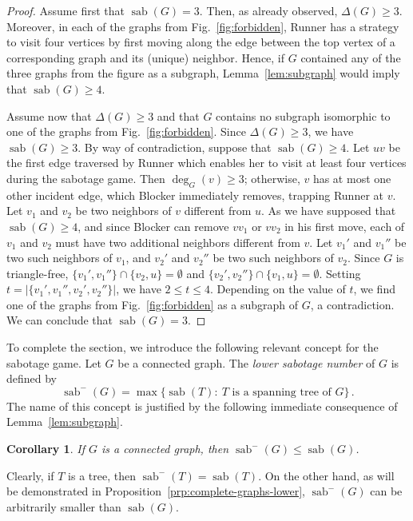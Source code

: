 \documentclass[12pt]{article}
\newtheorem{corollary}[theorem]{Corollary}
\DeclareMathOperator{\sab}{\mathrm{sab}}
\begin{document}
\begin{proof}
Assume first that $\sab(G) = 3$. Then, as already observed, $\Delta(G)\ge 3$. Moreover, in each of the graphs from Fig.~\ref{fig:forbidden}, Runner has a strategy to visit four vertices by first moving along the edge between the top vertex of a corresponding graph and its (unique) neighbor. Hence, if $G$ contained any of the three graphs from the figure as a subgraph, Lemma~\ref{lem:subgraph} would imply that $\sab(G)\ge 4$.

Assume now that $\Delta(G) \ge 3$ and that $G$ contains no subgraph isomorphic to one of the graphs from Fig.~\ref{fig:forbidden}. Since $\Delta(G) \ge 3$, we have $\sab(G)\ge 3$. By way of contradiction, suppose that $\sab (G)\ge 4$. Let $uv$ be the first edge traversed by Runner which enables her to visit at least four vertices during the sabotage game. Then $\deg_G(v)\ge 3$; otherwise, $v$ has at most one other incident edge, which Blocker immediately removes, trapping Runner at $v$. Let $v_1$ and $v_2$ be two neighbors of $v$ different from $u$. As we have supposed that $\sab (G)\ge 4$, and since Blocker can remove $vv_1$ or $vv_2$ in his first move, each of $v_1$ and $v_2$ must have two additional neighbors different from $v$. Let $v_1'$ and $v_1''$ be two such neighbors of $v_1$, and $v_2'$ and $v_2''$ be two such neighbors of $v_2$. Since $G$ is triangle-free, $\{v_1', v_1''\} \cap \{v_2, u\} = \emptyset$ and $\{v_2', v_2''\} \cap \{v_1, u\} = \emptyset$. Setting $t = |\{v_1', v_1'', v_2', v_2''\}|$, we have $2\le t\le 4$. Depending on the value of $t$, we find one of the graphs from Fig.~\ref{fig:forbidden} as a subgraph of $G$, a contradiction. We can conclude that $\sab(G) = 3$.
\end{proof}

To complete the section, we introduce the following relevant concept for the sabotage game. Let $G$ be a connected graph. The \emph{lower sabotage number} of $G$ is defined by 
$$\sab^{-}(G) = \max\{\sab(T):\ T \text{ is a spanning tree of } G \}\,.$$
The name of this concept is justified by the following immediate consequence of Lemma~\ref{lem:subgraph}. 

\begin{corollary}
\label{cor:sab-versus-sab-minus}
If $G$ is a connected graph, then $\sab^{-}(G) \le \sab(G)$.
\end{corollary}

Clearly, if $T$ is a tree, then $\sab^{-}(T) = \sab(T)$. On the other hand, as will be demonstrated in Proposition~\ref{prp:complete-graphs-lower}, $\sab^{-}(G)$ can be arbitrarily smaller than $\sab(G)$.
\end{document}
